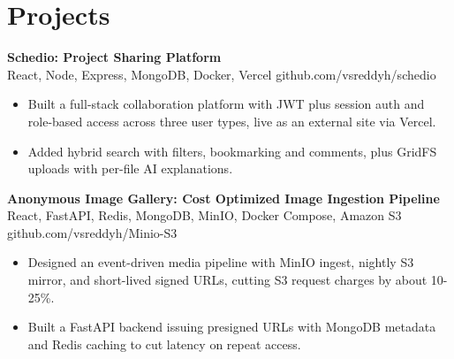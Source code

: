 \documentclass[a4paper,11pt]{article}
\newcommand{\resumeItem}[1]{\item \small{#1}}
\newcommand{\resumeSubheading}[4]{%
  \textbf{#1} \hfill \textbf{#2} \\
{#3} \hfill {#4}
}
\newcommand{\resumeSubHeadingListStart}{\begin{itemize}}
\newcommand{\resumeSubHeadingListEnd}{\end{itemize}}
\begin{document}
\section*{Projects}

\resumeSubheading
{Schedio: Project Sharing Platform}{}{React, Node, Express, MongoDB, Docker, Vercel}{github.com/vsreddyh/schedio}
\resumeSubHeadingListStart
\resumeItem{Built a full-stack collaboration platform with JWT plus session auth and role-based access across three user types, live as an external site via Vercel.}
\resumeItem{Added hybrid search with filters, bookmarking and comments, plus GridFS uploads with per-file AI explanations.}
\resumeSubHeadingListEnd

\resumeSubheading
{Anonymous Image Gallery: Cost Optimized Image Ingestion Pipeline}{}{React, FastAPI, Redis, MongoDB, MinIO, Docker Compose, Amazon S3}{github.com/vsreddyh/Minio-S3}
\resumeSubHeadingListStart
\resumeItem{Designed an event-driven media pipeline with MinIO ingest, nightly S3 mirror, and short-lived signed URLs, cutting S3 request charges by about 10-25\%.}
\resumeItem{Built a FastAPI backend issuing presigned URLs with MongoDB metadata and Redis caching to cut latency on repeat access.}
\resumeSubHeadingListEnd


\vspace{-0.6em}
\end{document}

